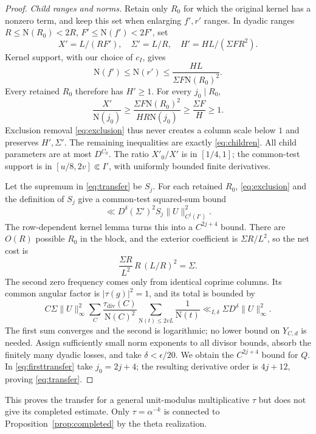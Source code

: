 \documentclass[11pt,a4paper]{article}
\numberwithin{equation}{section}
\theoremstyle{definition}
\theoremstyle{remark}
\newcommand{\N}{\mathrm N}
\newcommand{\tauD}{\tau_{\mathrm{div}}}
\begin{document}
\begin{proof}
\emph{Child ranges and norms.} Retain only $R_0$ for which the original kernel has a nonzero term, and keep this set when enlarging $f',r'$ ranges. In dyadic ranges $R\le\N(R_0)<2R$, $F'\le\N(f')<2F'$, set
\[
 X'=L/(RF'),\quad \Sigma'=L/R,\quad H'=HL/(\Sigma FR^2).
\]
Kernel support, with our choice of $c_I$, gives
\[
 \N(f')\le\N(r')\le\frac{HL}{\Sigma F\N(R_0)^2}.
\]
Every retained $R_0$ therefore has $H'\ge1$. For every $j_0\mid R_0$,
\begin{equation}\label{eq:childpositive}
 \frac{X'}{\N(j_0)}\ge\frac{\Sigma F\N(R_0)^2}{HR\N(j_0)}\ge\frac{\Sigma F}{H}\ge1.
\end{equation}
Exclusion removal \eqref{eq:exclusion} thus never creates a column scale below $1$ and preserves $H',\Sigma'$. The remaining inequalities are exactly \eqref{eq:children}. All child parameters are at most $D^{C_0}$. The ratio $X'_0/X'$ is in $[1/4,1]$; the common-test support is in $[u/8,2v]\Subset I'$, with uniformly bounded finite derivatives.

Let the supremum in \eqref{eq:transfer} be $S_j$. For each retained $R_0$, \eqref{eq:exclusion} and the definition of $S_j$ give a common-test squared-sum bound
\[
 \ll D^\delta(\Sigma')^2S_j\|U\|_{C^j(I')}^2.
\]
The row-dependent kernel lemma turns this into a $C^{2j+4}$ bound. There are $O(R)$ possible $R_0$ in the block, and the exterior coefficient is $\Sigma R/L^2$, so the net cost is
\[
 \frac{\Sigma R}{L^2}\,R\,(L/R)^2=\Sigma.
\]
The second zero frequency comes only from identical coprime columns. Its common angular factor is $|\tau(g)|^2=1$, and its total is bounded by
\[
 C\Sigma\|U\|_\infty^2
 \sum_C\frac{\tauD(C)}{\N(C)^2}
 \sum_{\N(t)\le2vL}\frac1{\N(t)}
 \ll_{I,\delta}\Sigma D^\delta\|U\|_\infty^2.
\]
The first sum converges and the second is logarithmic; no lower bound on $Y_{C,d}$ is needed. Assign sufficiently small norm exponents to all divisor bounds, absorb the finitely many dyadic losses, and take $\delta<\epsilon/20$. We obtain the $C^{2j+4}$ bound for $Q$. In \eqref{eq:firsttransfer} take $j_0=2j+4$; the resulting derivative order is $4j+12$, proving \eqref{eq:transfer}.
\end{proof}

This proves the transfer for a general unit-modulus multiplicative $\tau$ but does not give its completed estimate. Only $\tau=\alpha^{-k}$ is connected to Proposition~\ref{prop:completed} by the theta realization.
\end{document}
